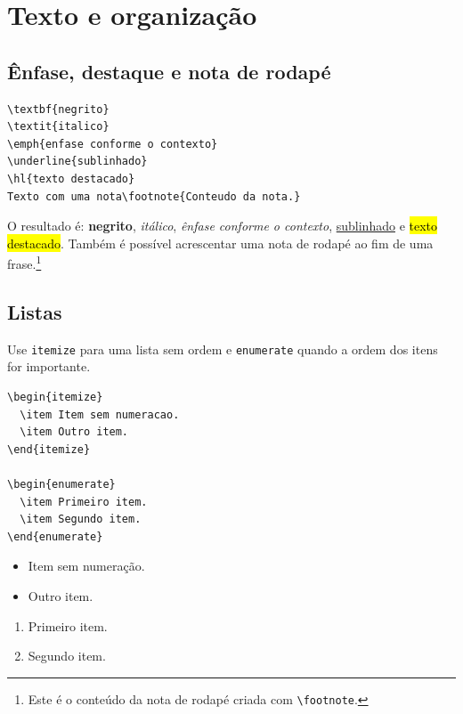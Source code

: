 \section{Texto e organização}

\subsection{Ênfase, destaque e nota de rodapé}

\begin{lstlisting}[language={[LaTeX]TeX},caption={Formatação de texto}]
\textbf{negrito}
\textit{italico}
\emph{enfase conforme o contexto}
\underline{sublinhado}
\hl{texto destacado}
Texto com uma nota\footnote{Conteudo da nota.}
\end{lstlisting}

O resultado é: \textbf{negrito}, \textit{itálico}, \emph{ênfase conforme o
contexto}, \underline{sublinhado} e \hl{texto destacado}. Também é possível
acrescentar uma nota de rodapé ao fim de uma frase.\footnote{Este é o conteúdo da
nota de rodapé criada com \texttt{\textbackslash footnote}.}

\subsection{Listas}

Use \texttt{itemize} para uma lista sem ordem e \texttt{enumerate} quando a ordem
dos itens for importante.

\begin{lstlisting}[language={[LaTeX]TeX},caption={Listas com e sem numeração}]
\begin{itemize}
  \item Item sem numeracao.
  \item Outro item.
\end{itemize}

\begin{enumerate}
  \item Primeiro item.
  \item Segundo item.
\end{enumerate}
\end{lstlisting}

\begin{itemize}
  \item Item sem numeração.
  \item Outro item.
\end{itemize}

\begin{enumerate}
  \item Primeiro item.
  \item Segundo item.
\end{enumerate}

